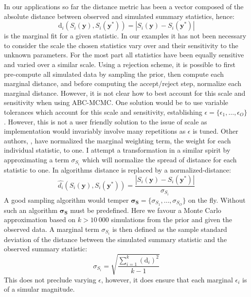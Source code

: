 In our applications so far the distance metric has been a vector composed of the absolute distance between observed and simulated summary statistics, hence:
\begin{equation}
\text{d}_i(S_i(\bm{y}),S_i(\bm{y^*})) = |S_i(\bm{y})-S_i(\bm{y^*})|
\label{marginal_distance}
\end{equation}
is the marginal fit for a given statistic. In our examples it has not been necessary to consider the scale the chosen statistics vary over and their sensitivity to the unknown parameters. For the most part all statistics have been equally sensitive and varied over a similar scale. Using a rejection scheme, it is possible to first pre-compute all simulated data by sampling the prior, then compute each marginal distance, and before computing the accept/reject step, normalize each marginal distance. However, it is not clear how to best account for this scale and sensitivity when using ABC-MCMC. One solution would be to use variable tolerances which account for this scale and sensitivity, establishing $\epsilon = \{\epsilon_1,\dots,\epsilon_O\}$. However, this is not a user friendly solution to the issue of scale as implementation would invariably involve many repetitions as $\epsilon$ is tuned. Other authors, \citet{Ratmann2010}, have normalized the marginal weighting term, the weight for each individual statistic, to one. I attempt a transformation in a similar spirit by approximating a term $\sigma_{S_i}$ which will normalize the spread of distance for each statistic to one. In algorithms distance is replaced by a normalized-distance:
\begin{equation}
\hat{d_i}(S_i(\bm{y}),S_i(\bm{y^*})) =  \frac{|S_i(\bm{y})-S_i(\bm{y^*})|}{\sigma_{S_i}}
\end{equation}
A good sampling algorithm would temper $\bm{\sigma_S} = \{\sigma_{S_1},\dots,\sigma_{S_O}\}$ on the fly. Without such an algorithm $\bm{\sigma_S}$ must be predefined. Here we favour a Monte Carlo approximation based on $k > 10\ 000$ simulations from the prior and given the observed data. A marginal term $\sigma_{S_i}$ is then defined as the sample standard deviation of the distance between the simulated summary statistic and the observed summary statistic:
\begin{equation}
\sigma_{S_i} = \sqrt{\frac{\sum_{i = 1}^{k}(\text{d}_i)^2}{k-1}}
\end{equation}
This does not preclude varying $\epsilon$, however, it does ensure that each marginal $\epsilon_i$ is of a simular magnitude. \par

